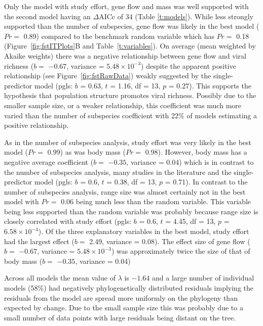 
Only the model with study effort, gene flow and mass was well supported with the second model having an $\Delta\text{AICc}$ of 34 (Table \ref{t:models}).
While less strongly supported than the number of subspecies, gene flow was likely in the best model ($Pr = $ 0.89) compared to the benchmark random variable which has $Pr = $ 0.18 (Figure~\ref{fig:fstITPlots}B and Table~\ref{t:variables}).
On average (mean weighted by Akaike weights) there was a negative relationship between gene flow and viral richness ($b = $ \ensuremath{-0.67}, variance = \ensuremath{5.48\times 10^{-3}}) despite the apparent positive relationship (see Figure~\ref{fig:fstRawData}) weakly suggested by the single-predictor model (pgls: $b$ = 0.63, $t$ = 1.16, df = 13, $p$ = 0.27).
This supports the hypothesis that population structure promotes viral richness.
Possibly due to the smaller sample size, or a weaker relationship, this coefficient was much more varied than the number of subspecies coefficient with 22\% of models estimating a positive relationship.

As in the number of subspecies analysis, study effort was very likely in the best model ($Pr = $ 0.99) as was body mass ($Pr = $ 0.98).
However, body mass has a negative average coefficient ($b = $ \ensuremath{-0.35}, variance = 0.04) which is in contrast to the number of subspecies analysis, many studies in the literature \cite{kamiya2014determines, turmelle2009correlates, gay2014parasite, maganga2014bat} and the single-predictor model (pgls: $b$ = 0.6, $t$ = 0.38, df = 13, $p$ = 0.71).
In contrast to the number of subspecies analysis, range size was almost certainly not in the best model with $Pr = $ 0.06 being much less than the random variable.
This variable being less supported than the random variable was probably because range size is closely correlated with study effort (pgls: $b$ = 0.6, $t$ = 4.45, df = 13, $p$ = \ensuremath{6.58\times 10^{-4}}).
Of the three explanatory variables in the best model, study effort had the largest effect ($b = $ 2.49, variance = 0.08).
The effect size of gene flow ($b = $ \ensuremath{-0.67}, variance = \ensuremath{5.48\times 10^{-3}}) was approximately twice the size of that of body mass ($b = $ \ensuremath{-0.35}, variance = 0.04)

Across all models the mean value of $\lambda$ is \ensuremath{-1.64} and a large number of individual models (58\%)  had negatively phylogenetically distributed residuals implying the residuals from the model are spread more uniformly on the phylogeny than expected by change.
Due to the small sample size this was probably due to a small number of data points with large residuals being distant on the tree.






